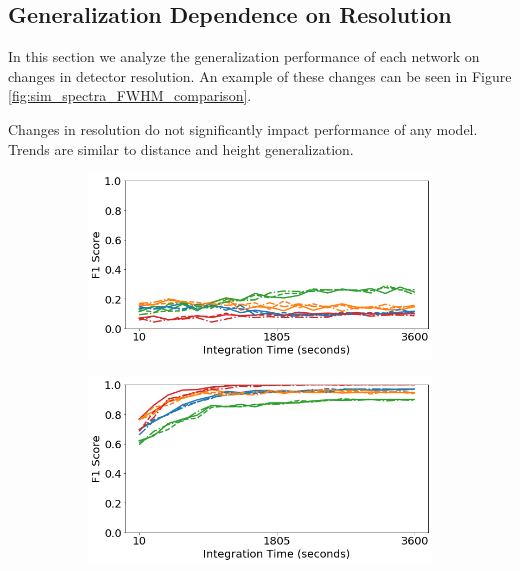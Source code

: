 \subsection{Generalization Dependence on Resolution}

In this section we analyze the generalization performance of each network on changes in detector resolution. An example of these changes can be seen in Figure \ref{fig:sim_spectra_FWHM_comparison}.

Changes in resolution do not significantly impact performance of any model. Trends are similar to distance and height generalization.


\begin{figure}[H]
     \centering
     \begin{subfigure}[b]{0.49\textwidth}
         \centering
         \includegraphics[width=\textwidth]{images/generalization-fwhm-easy-01.png}
         \caption{}
         \label{fig:generalization-fwhm-easy-01}
     \end{subfigure}
     \hfill
     \begin{subfigure}[b]{0.49\textwidth}
         \centering
         \includegraphics[width=\textwidth]{images/generalization-fwhm-easy-05.png}
         \caption{}
         \label{fig:generalization-fwhm-easy-05}
     \end{subfigure}


\end{figure}
